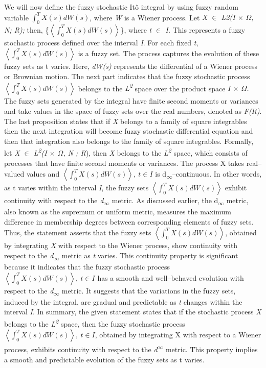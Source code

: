 \documentclass[12pt,a4paper]{report}
\numberwithin{equation}{section}
\begin{document}
We will now define the fuzzy stochastic Itô integral by using fuzzy
random variable \(\int_{0}^{T}{X(s)dW(s)}\), where \emph{W} is a Wiener
process. Let \emph{X $\in$ L2(I $\times$ $\Omega$, N; R);} then,
\{\(\left\langle \int_{0}^{T}{X(s)dW(s)} \right\rangle\)\}, where
\emph{t $\in$ I.} This represents a fuzzy stochastic process defined over
the interval \emph{I}. For each fixed \emph{t},
\(\left\langle \int_{0}^{T}{X(s)dW(s)} \right\rangle\) is a fuzzy set.
The process captures the evolution of these fuzzy sets as t varies.
Here, \emph{dW(s)} represents the differential of a Wiener process or
Brownian motion. The next part indicates that the fuzzy stochastic
process \(\left\langle \int_{0}^{T}{X(s)dW(s)} \right\rangle\) belongs
to the \emph{L\textsuperscript{2}} space over the product space \emph{I
$\times$ $\Omega$.} The fuzzy sets generated by the integral have finite second
moments or variances and take values in the space of fuzzy sets over the
real numbers, denoted as \emph{F(R)}. The last proposition states that
if \emph{X} belongs to a family of square integrables then the next
integration will become fuzzy stochastic differential equation and then
that integration also belongs to the family of square integrables.
Formally, let \emph{X $\in$ L\textsuperscript{2}(I $\times$ $\Omega$, N ; R}), then
\emph{X} belongs to the \emph{L\textsuperscript{2}} space, which
consists of processes that have finite second moments or variances. The
process X takes real--valued values and
\(\left\langle \int_{0}^{T}{X(s)dW(s)} \right\rangle,\ t \in I\) is
d\textsubscript{$\infty$}--continuous. In other words, as t varies within the
interval \emph{I}, the fuzzy sets
\(\left\langle \int_{0}^{T}{X(s)dW(s)} \right\rangle\) exhibit
continuity with respect to the \emph{d\textsubscript{$\infty$}} metric. As
discussed earlier, the d\textsubscript{$\infty$} metric, also known as the
supremum or uniform metric, measures the maximum difference in
membership degrees between corresponding elements of fuzzy sets. Thus,
the statement asserts that the fuzzy sets
\(\left\langle \int_{0}^{T}{X(s)dW(s)} \right\rangle\), obtained by
integrating \emph{X} with respect to the Wiener process, show continuity
with respect to the \emph{d\textsubscript{$\infty$}} metric as \emph{t} varies.
This continuity property is significant because it indicates that the
fuzzy stochastic process
\(\left\langle \int_{0}^{T}{X(s)dW(s)} \right\rangle,\ t \in I\) has a
smooth and well--behaved evolution with respect to the
\emph{d\textsubscript{$\infty$}} metric. It suggests that the variations in the
fuzzy sets, induced by the integral, are gradual and predictable as
\emph{t} changes within the interval \emph{I}. In summary, the given
statement states that if the stochastic process \emph{X} belongs to the
\emph{L\textsuperscript{2}} space, then the fuzzy stochastic process
\(\left\langle \int_{0}^{T}{X(s)dW(s)} \right\rangle,\ t \in I\),
obtained by integrating X with respect to a Wiener process, exhibits
continuity with respect to the \emph{d\textsuperscript{$\infty$}} metric. This
property implies a smooth and predictable evolution of the fuzzy sets as
t varies.
\end{document}
